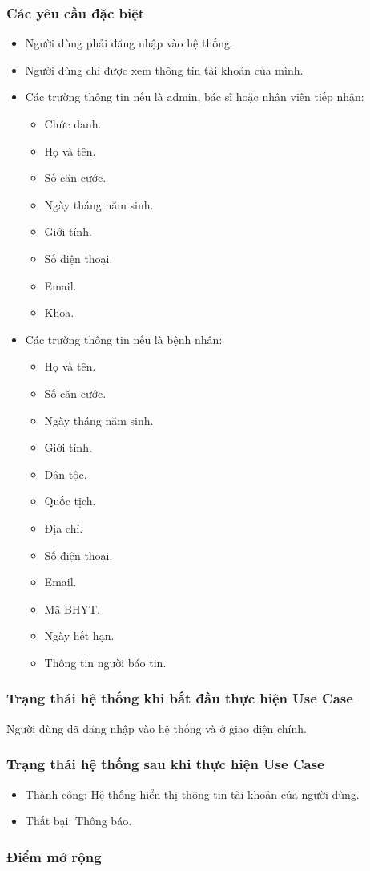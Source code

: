 \subsubsection{Các yêu cầu đặc biệt}
\begin{itemize}
  \item Người dùng phải đăng nhập vào hệ thống.
  \item Người dùng chỉ được xem thông tin tài khoản của mình.
  \item Các trường thông tin nếu là admin, bác sĩ hoặc nhân viên tiếp nhận:
    \begin{itemize}
      \item Chức danh.
      \item Họ và tên.
      \item Số căn cước.
      \item Ngày tháng năm sinh.
      \item Giới tính.
      \item Số điện thoại.
      \item Email.
      \item Khoa.
    \end{itemize}
  \item Các trường thông tin nếu là bệnh nhân:
    \begin{itemize}
      \item Họ và tên.
      \item Số căn cước.
      \item Ngày tháng năm sinh.
      \item Giới tính.
      \item Dân tộc.
      \item Quốc tịch.
      \item Địa chỉ.
      \item Số điện thoại.
      \item Email.
      \item Mã BHYT.
      \item Ngày hết hạn.
      \item Thông tin người báo tin.
    \end{itemize}
\end{itemize}

\subsubsection{Trạng thái hệ thống khi bắt đầu thực hiện Use Case}
Người dùng đã đăng nhập vào hệ thống và ở giao diện chính.

\subsubsection{Trạng thái hệ thống sau khi thực hiện Use Case}
\begin{itemize}
  \item Thành công: Hệ thống hiển thị thông tin tài khoản của người dùng.
  \item Thất bại: Thông báo.
\end{itemize}

\subsubsection{Điểm mở rộng}